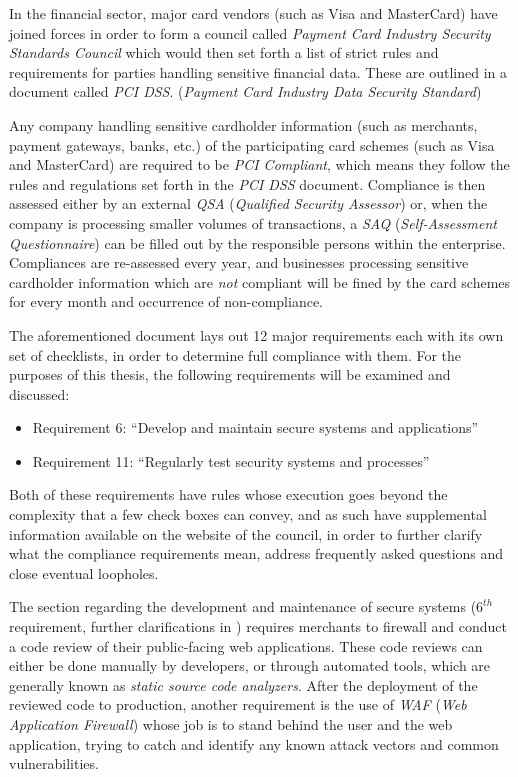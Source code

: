 \documentclass[a4paper,12pt]{article}
\begin{document}
	In the financial sector, major card vendors (such as Visa and MasterCard) have joined forces in order to form a council called \textit{Payment Card Industry Security Standards Council} which would then set forth a list of strict rules and requirements for parties handling sensitive financial data. These are outlined in a document called \textit{PCI DSS}. (\textit{Payment Card Industry Data Security Standard})
	
	Any company handling sensitive cardholder information (such as merchants, payment gateways, banks, etc.) of the participating card schemes (such as Visa and MasterCard) are required to be \textit{PCI Compliant}, which means they follow the rules and regulations set forth in the \textit{PCI DSS} document. Compliance is then assessed either by an external \textit{QSA} (\textit{Qualified Security Assessor}) or, when the company is processing smaller volumes of transactions, a \textit{SAQ} (\textit{Self-Assessment Questionnaire}) can be filled out by the responsible persons within the enterprise. Compliances are re-assessed every year, and businesses processing sensitive cardholder information which are \textit{not} compliant will be fined by the card schemes for every month and occurrence of non-compliance.\cite{wfargo15}
	
	The aforementioned document lays out 12 major requirements\cite{pcidss31} each with its own set of checklists, in order to determine full compliance with them. For the purposes of this thesis, the following requirements will be examined and discussed:
	
	\begin{itemize}
		\item Requirement 6: ``Develop and maintain secure systems and applications''
		\item Requirement 11: ``Regularly test security systems and processes''
	\end{itemize}
	
	Both of these requirements have rules whose execution goes beyond the complexity that a few check boxes can convey, and as such have supplemental information available on the website of the council, in order to further clarify what the compliance requirements mean, address frequently asked questions and close eventual loopholes.
	
	The section regarding the development and maintenance of secure systems ($6^{th}$ requirement, further clarifications in \cite{pcireq6}) requires merchants to firewall and conduct a code review of their public-facing web applications. These code reviews can either be done manually by developers, or through automated tools, which are generally known as \textit{static source code analyzers}. After the deployment of the reviewed code to production, another requirement is the use of \textit{WAF} (\textit{Web Application Firewall}) whose job is to stand behind the user and the web application, trying to catch and identify any known attack vectors and common vulnerabilities.
	
\end{document}
